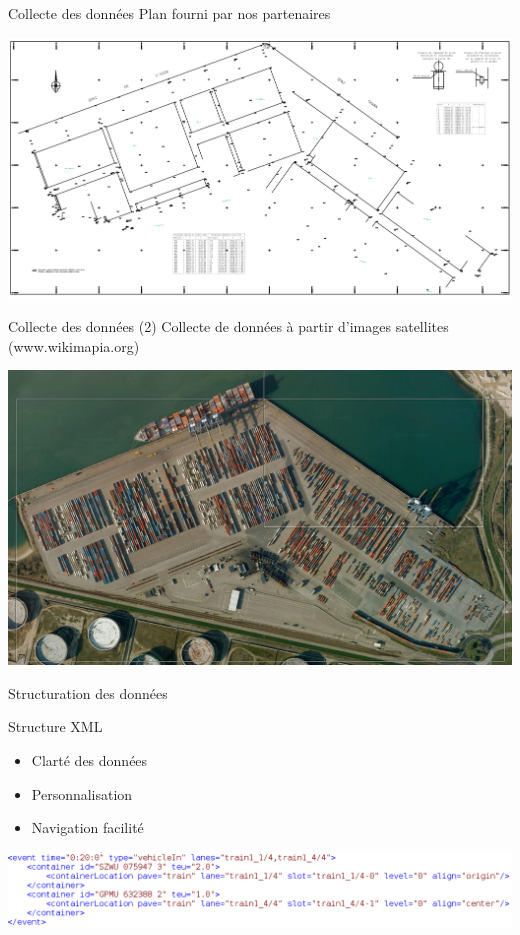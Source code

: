 \documentclass{beamer}
\begin{document}
\begin{frame}{Collecte des données}
    Plan fourni par nos partenaires
    \begin{center}
      \includegraphics[height=.70\textheight]{fig/planNormandieZ.png}
    \end{center}
\end{frame}
\begin{frame}{Collecte des données (2)}
    Collecte de données à partir d'images satellites (www.wikimapia.org)
    \begin{center}
      \includegraphics[height=.70\textheight]{fig/NormandieZ.png}
    \end{center}
\end{frame}
\begin{frame}{Structuration des données}
  
  \begin{block}{Structure XML}
    \begin{itemize}
      \item Clarté des données
      \item Personnalisation
      \item Navigation facilité
    \end{itemize}
   \end{block}
   
  \begin{center}   
    \includegraphics[width=.90\textwidth]{fig/structureXML.png}
   \end{center}
\end{frame}
\end{document}

